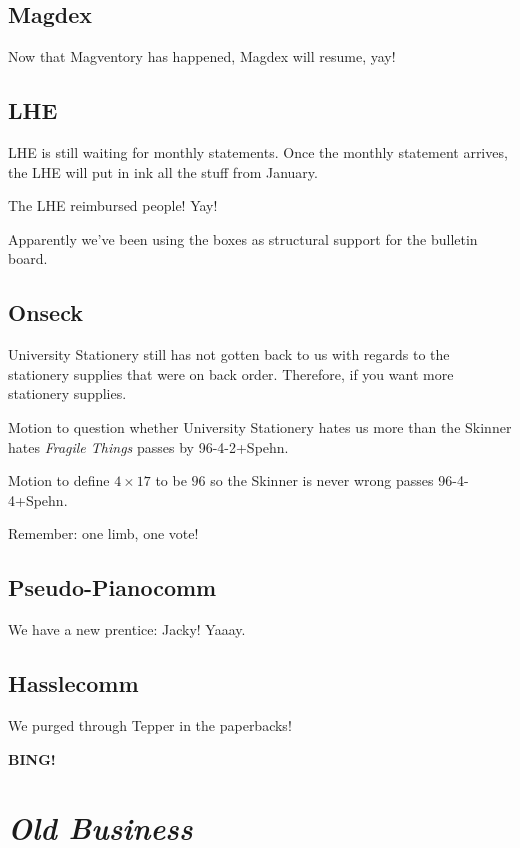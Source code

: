 \documentclass[10pt]{article}
\newcommand{\bing}{{\bf BING!} }
\newcommand{\goto}[1]{\bing \vskip 12pt \section*{{\em{#1}}}}
\begin{document}
\subsection*{Magdex}

Now that Magventory has happened, Magdex will resume, yay!

\subsection*{LHE}

LHE is still waiting for monthly statements.  Once the monthly statement arrives, the LHE
will put in ink all the stuff from January.

The LHE reimbursed people!  Yay!

Apparently we've been using the boxes as structural support for the bulletin board.

\subsection*{Onseck}

University Stationery still has not gotten back to us with regards to the stationery supplies that were
on back order.  Therefore, if you want more stationery supplies.

Motion to question whether University Stationery hates us more than the Skinner hates \emph{Fragile Things} passes by 96-4-2+Spehn.

Motion to define $4 \times 17$ to be $96$ so the Skinner is never wrong passes 96-4-4+Spehn.

Remember: one limb, one vote! 

\subsection*{Pseudo-Pianocomm}

We have a new prentice: Jacky!  Yaaay.

\subsection*{Hasslecomm}

We purged through Tepper in the paperbacks!


\goto{Old Business}
\end{document}

